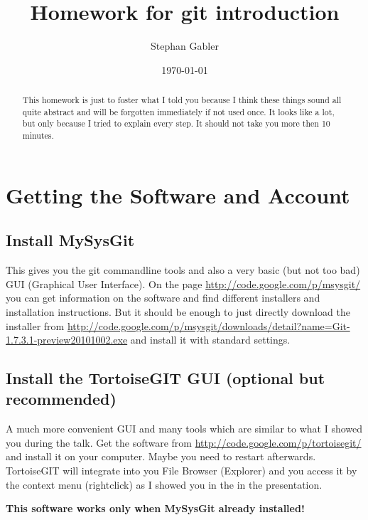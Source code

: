 \documentclass[]{article}
\title{Homework for git introduction}
\author{Stephan Gabler}
\date{\today}
\begin{document}
\ifpdf
{}
\else
{}
\fi

\maketitle

\begin{abstract}
    This homework is just to foster what I told you because I think these things sound all quite abstract and will be forgotten immediately if not used once. It looks like a lot, but only because I tried to explain every step. It should not take you more then 10 minutes.
\end{abstract}

\section{Getting the Software and Account}

\subsection{Install MySysGit} %
\label{sg:sub:install_mysysgit}
This gives you the git commandline tools and also a very basic (but not too bad) GUI (Graphical User Interface). On the page \url{http://code.google.com/p/msysgit/} you can get information on the software and find different installers and installation instructions. But it should be enough to just directly download the installer from \url{http://code.google.com/p/msysgit/downloads/detail?name=Git-1.7.3.1-preview20101002.exe} and install it with standard settings.



\subsection{Install the TortoiseGIT GUI (optional but recommended)} %
\label{sg:sub:install_the_tortoisegit_gui_optional_}
A much more convenient GUI and many tools which are similar to what I showed you during the talk. Get the software from \url{http://code.google.com/p/tortoisegit/} and install it on your computer. Maybe you need to restart afterwards. TortoiseGIT will integrate into you File Browser (Explorer) and you access it by the context menu (rightclick) as I showed you in the in the presentation.

\textbf{This software works only when MySysGit already installed!}
\end{document}
